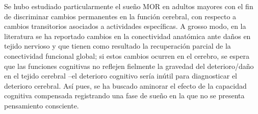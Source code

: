 Se hubo estudiado particularmente el sue\~no MOR en adultos mayores con el fin de discriminar
cambios permanentes en la funci\'on cerebral, con respecto a cambios transitorios asociados
a actividades espec\'ificas.
A grosso modo, en la literatura se ha reportado cambios en la conectividad anat\'omica
ante da\~nos en tejido nervioso y que tienen como resultado la recuperaci\'on parcial
de la conectividad funcional global; si estos cambios ocurren en el cerebro, se espera que las
funciones cognitivas no reflejen fielmente la gravedad del deterioro/da\~no en el tejido cerebral
--el deterioro cognitivo ser\'ia in\'util para diagnosticar el deterioro cerebral.
As\'i pues, se ha buscado aminorar el efecto de la capacidad cognitiva compensada
registrando una fase de sue\~no en la que no se presenta pensamiento consciente.

